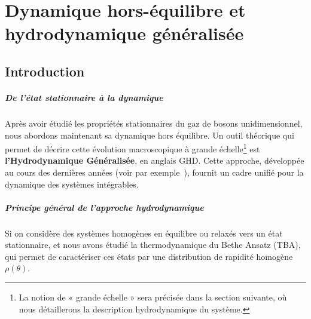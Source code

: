 \chapter{Dynamique hors-équilibre et hydrodynamique généralisée}
\label{chap:GHD}
\minitoc

\section*{Introduction}

\paragraph*{De l’état stationnaire à la dynamique}  
Après avoir étudié les propriétés stationnaires du gaz de bosons unidimensionnel, nous abordons maintenant sa dynamique hors équilibre. Un outil théorique qui permet de décrire cette évolution macroscopique à grande échelle\footnote{La notion de « grande échelle » sera précisée dans la section suivante, où nous détaillerons la description hydrodynamique du système.}
est {\bf l’Hydrodynamique Généralisée}, en anglais \gls{GHD}. Cette approche, développée au cours des dernières années (voir par exemple~\cite{Doyon_GHD_2020,Bouchoule_2022,ESSLER2023127572,kerr2023theory}), fournit un cadre unifié pour la dynamique des systèmes intégrables.

\paragraph*{Principe général de l’approche hydrodynamique}  

Si on considère des systèmes homogènes en équilibre ou relaxés vers un état stationnaire, et nous avons étudié la thermodynamique du Bethe Ansatz (\gls{TBA}), qui permet de caractériser ces états par une distribution de rapidité homogène $\rho(\theta)$.  

